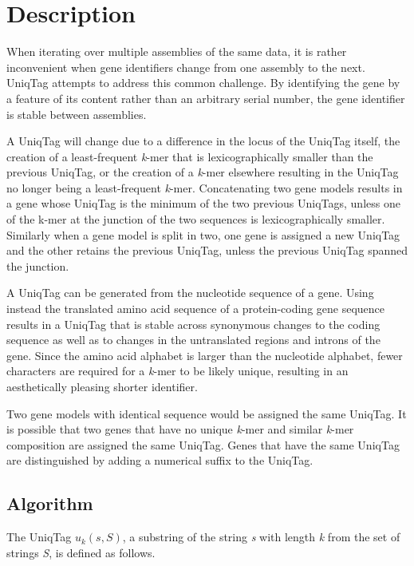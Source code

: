\documentclass{bioinfo}
\begin{document}
\section{Description}\label{description}

When iterating over multiple assemblies of the same data, it is rather
inconvenient when gene identifiers change from one assembly to the next.
UniqTag attempts to address this common challenge. By identifying the
gene by a feature of its content rather than an arbitrary serial number,
the gene identifier is stable between assemblies.

A UniqTag will change due to a difference in the locus of the UniqTag
itself, the creation of a least-frequent \emph{k}-mer that is
lexicographically smaller than the previous UniqTag, or the creation of
a \emph{k}-mer elsewhere resulting in the UniqTag no longer being a
least-frequent \emph{k}-mer. Concatenating two gene models results in a
gene whose UniqTag is the minimum of the two previous UniqTags, unless
one of the k-mer at the junction of the two sequences is
lexicographically smaller. Similarly when a gene model is split in two,
one gene is assigned a new UniqTag and the other retains the previous
UniqTag, unless the previous UniqTag spanned the junction.

A UniqTag can be generated from the nucleotide sequence of a gene. Using
instead the translated amino acid sequence of a protein-coding gene
sequence results in a UniqTag that is stable across synonymous changes
to the coding sequence as well as to changes in the untranslated regions
and introns of the gene. Since the amino acid alphabet is larger than
the nucleotide alphabet, fewer characters are required for a
\emph{k}-mer to be likely unique, resulting in an aesthetically pleasing
shorter identifier.

Two gene models with identical sequence would be assigned the same
UniqTag. It is possible that two genes that have no unique \emph{k}-mer
and similar \emph{k}-mer composition are assigned the same UniqTag.
Genes that have the same UniqTag are distinguished by adding a numerical
suffix to the UniqTag.

\subsection{Algorithm}\label{algorithm}

The UniqTag $u_k(s, S)$, a substring of the string \emph{s} with length
\emph{k} from the set of strings \emph{S}, is defined as follows.
\end{document}
